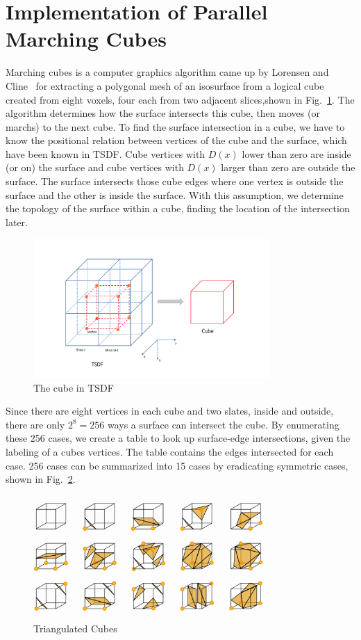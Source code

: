 \documentclass{article}
\begin{document}
\section{Implementation of Parallel Marching Cubes}

Marching cubes is a computer graphics algorithm came up by Lorensen and Cline~\cite{Lorensen:1987:MCH:37402.37422} for extracting a polygonal mesh of an isosurface from a logical cube created from eight voxels, four each from two adjacent slices,shown in Fig.~\ref{fig:tsdf_mc}. The algorithm determines how the surface intersects this cube, then moves (or marchs) to the next cube. To find the surface intersection in a cube, we have to know the positional relation between vertices of the cube and the surface, which have been known in TSDF. Cube vertices with $D{(x)}$ lower than zero are inside (or on) the surface and cube vertices with  $D{(x)}$ larger than zero are outside the surface. The surface intersects those cube edges where one vertex is outside the surface and the other is inside the surface. With this assumption, we determine the topology of the surface within a cube, finding the location of the intersection later. 

\begin{figure}[h]
\centering
\includegraphics[width=9cm]{figures/TSDF_MC.png}
\caption{The cube in TSDF}
\label{fig:tsdf_mc}
\end{figure}

Since there are eight vertices in each cube and two slates, inside and outside, there are only $2^8 = 256$ ways a surface can intersect the cube. By enumerating these 256 cases, we create a table to look up surface-edge intersections, given the labeling of a cubes vertices. The table contains the edges intersected for each case. 256 cases can be summarized into 15 cases by eradicating symmetric cases, shown in Fig.~\ref{fig:triangulation}.

\begin{figure}[h]
\centering
\includegraphics[width=9cm]{figures/mc.jpg}
\caption{Triangulated Cubes}
\label{fig:triangulation}
\end{figure}
\end{document}
